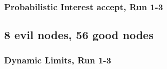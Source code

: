 \documentclass[onecolumn]{IEEEtran}
\begin{document}
\begin{minipage}[b]{\textwidth}

\end{minipage}

\clearpage

\subsubsection{Probabilistic Interest accept, Run 1-3}

\begin{minipage}[b]{\textwidth}

\end{minipage}



% 



% 


\clearpage
\subsection{\textbf{8 evil nodes}, 56 good nodes}

\subsubsection{Dynamic Limits, Run 1-3}
\end{document}
